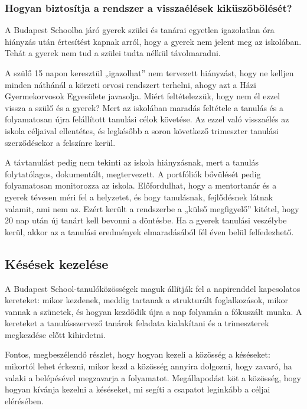 \hypertarget{hogyan-biztositja-a-rendszer-a-visszaelesek-kikuszoboleset}{%
\subsubsection{Hogyan biztosítja a rendszer a visszaélések
kiküszöbölését?}\label{hogyan-biztositja-a-rendszer-a-visszaelesek-kikuszoboleset}}

A Budapest Schoolba járó gyerek szülei és tanárai egyetlen igazolatlan
óra hiányzás után értesítést kapnak arról, hogy a gyerek nem jelent meg
az iskolában. Tehát a gyerek nem tud a szülei tudta nélkül távolmaradni.

A szülő 15 napon keresztül „igazolhat'' nem tervezett hiányzást, hogy
ne kelljen minden náthánál a körzeti orvosi rendszert terhelni, ahogy
azt a Házi Gyermekorvosok Egyesülete javasolja. Miért feltételezzük,
hogy nem él ezzel vissza a szülő és a gyerek? Mert az iskolában maradás
feltétele a tanulás és a folyamatosan újra felállított tanulási célok
követése. Az ezzel való visszaélés az iskola céljaival ellentétes, és
legkésőbb a soron következő trimeszter tanulási szerződésekor a
felszínre kerül.

A távtanulást pedig nem tekinti az iskola hiányzásnak, mert a tanulás
folytatólagos, dokumentált, megtervezett. A portfóliók bővülését pedig
folyamatosan monitorozza az iskola. Előfordulhat, hogy a mentortanár és a gyerek tévesen
méri fel a helyzetet, és hogy tanulásnak, fejlődésnek
látnak valamit, ami nem az. Ezért került a rendszerbe a „külső
megfigyelő'' kitétel, hogy 20 nap után új tanárt kell bevonni a döntésbe.
Ha a gyerek tanulási veszélybe kerül, akkor az a tanulási eredmények
elmaradásából fél éven belül felfedezhető.

\hypertarget{kesesek-kezelese}{%
\subsection{Késések kezelése}\label{kesesek-kezelese}}

A Budapest School-tanulóközösségek maguk állítják fel a napirenddel\break
kapcsolatos kereteket: mikor kezdenek, meddig tartanak a strukturált
foglalkozások, mikor vannak a szünetek, és hogyan kezdődik újra a nap
folyamán a fókuszált munka. A kereteket a tanulásszervező tanárok
feladata kialakítani és a trimeszterek megkezdése előtt kihirdetni.

Fontos, megbeszélendő részlet, hogy hogyan kezeli a közösség a
késéseket: mikortól lehet érkezni, mikor kezd a közösség annyira
dolgozni, hogy zavaró, ha valaki a belépésével megzavarja a folyamatot.
Megállapodást köt a közösség, hogy hogyan kívánja kezelni a késéseket,
mi segíti a csapatot leginkább a céljai elérésében.

